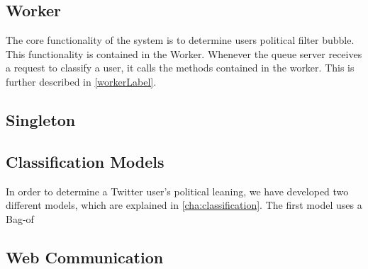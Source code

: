 \subsection{Worker}
The core functionality of the system is to determine users political filter
bubble. This functionality is contained in the Worker. Whenever the queue server
receives a request to classify a user, it calls the methods contained in the
worker. This is further described in \autoref{workerLabel}.

\subsection{Singleton}


\subsection{Classification Models}
In order to determine a Twitter user's political leaning, we have developed two
different models, which are explained in \autoref{cha:classification}. The first
model uses a Bag-of





\subsection{Web Communication}
























